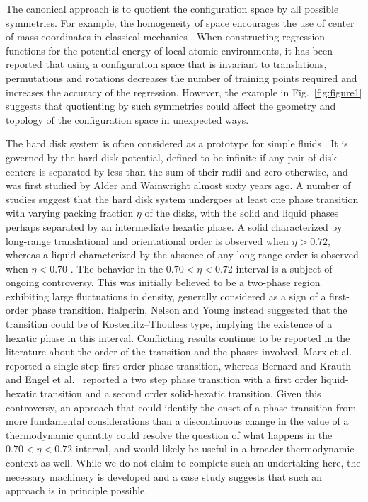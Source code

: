 \documentclass[default,iicol]{sn-jnl}%
\theoremstyle{thmstyleone}%
\theoremstyle{thmstyletwo}%
\theoremstyle{thmstylethree}%
\providecommand{\etal}{et al.\ }
\begin{document}
The canonical approach is to quotient the configuration space by all possible symmetries. For example, the homogeneity of space encourages the use of center of mass coordinates in classical mechanics \cite{denman1965invariance}. When constructing regression functions for the potential energy of local atomic environments, it has been reported \cite{behler2007,kocer2019} that using a configuration space that is invariant to translations, permutations and rotations decreases the number of training points required and increases the accuracy of the regression. However, the example in Fig.\ \ref{fig:figure1} suggests that quotienting by such symmetries could affect the geometry and topology of the configuration space in unexpected ways.

The hard disk system is often considered as a prototype for simple fluids \cite{dyre2016simple}. It is governed by the hard disk potential, defined to be infinite if any pair of disk centers is separated by less than the sum of their radii and zero otherwise, and was first studied by Alder and Wainwright \cite{alder1962phase} almost sixty years ago. A number of studies suggest that the hard disk system undergoes at least one phase transition with varying packing fraction $\eta$ of the disks, with the solid and liquid phases perhaps separated by an intermediate hexatic phase. A solid characterized by long-range translational and orientational order is observed when $\eta > 0.72$, whereas a liquid characterized by the absence of any long-range order is observed when $\eta < 0.70$ \cite{mitus1997local,weber1995melting}. The behavior in the $0.70 < \eta < 0.72$ interval is a subject of ongoing controversy. This was initially believed to be a two-phase region exhibiting large fluctuations in density, generally considered as a sign of a first-order phase transition. Halperin, Nelson \cite{halperin1978theory} and Young \cite{young1979melting} instead suggested that the transition could be of Kosterlitz--Thouless type, implying the existence of a hexatic phase in this interval. Conflicting results continue to be reported in the literature about the order of the transition and the phases involved. Marx \etal \cite{mitus1997local,weber1995melting} reported a single step first order phase transition, whereas Bernard and Krauth \cite{bernard2011two} and Engel \etal \cite{engel2013hard} reported a two step phase transition with a first order liquid-hexatic transition and a second order solid-hexatic transition. Given this controversy, an approach that could identify the onset of a phase transition from more fundamental considerations than a discontinuous change in the value of a thermodynamic quantity could resolve the question of what happens in the $0.70 < \eta < 0.72$ interval, and would likely be useful in a broader thermodynamic context as well. While we do not claim to complete such an undertaking here, the necessary machinery is developed and a case study suggests that such an approach is in principle possible.
\end{document}
